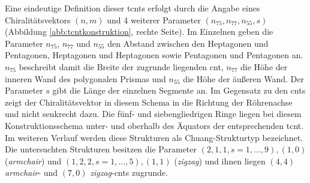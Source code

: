 Eine eindeutige Definition dieser \acp{tcnt} erfolgt durch die Angabe eines Chiralitätsvektors $(n,m)$ und 4 weiterer Parameter $(n_{75},n_{77},n_{55},s)$ (Abbildung \ref{abb:tcntkonstruktion}, rechte Seite). Im Einzelnen geben die Parameter $n_{75}$, $n_{77}$ und $n_{55}$ den Abstand zwischen den Heptagonen und Pentagonen, Heptagonen und Heptagonen sowie Pentagonen und Pentagonen an. $n_{75}$ beschreibt damit die Breite der zugrunde liegenden \ac{cnt}, $n_{77}$ die Höhe der inneren Wand des polygonalen Prismas und $n_{55}$ die Höhe der äußeren Wand. Der Parameter $s$ gibt die Länge der einzelnen Segmente an. Im Gegensatz zu den \acp{cnt} zeigt der Chiralitätsvektor in diesem Schema in die Richtung der Röhrenachse und nicht senkrecht dazu. Die fünf- und siebengliedrigen Ringe liegen bei diesem Konstruktionsschema unter- und oberhalb des Äquators der entsprechenden \ac{tcnt}. Im weiteren Verlauf werden diese Strukturen als \glqq Chuang-Strukturtyp\grqq{} bezeichnet. Die untersuchten Strukturen besitzen die Parameter $(2,1,1,s=1,\dots,9),(1,0)$ (\textit{armchair}) und $(1,2,2,s=1,\dots,5),(1,1)$ (\textit{zigzag}) und ihnen liegen $(4,4)$ \textit{armchair}- und $(7,0)$ \textit{zigzag}-\acp{cnt} zugrunde.\\

